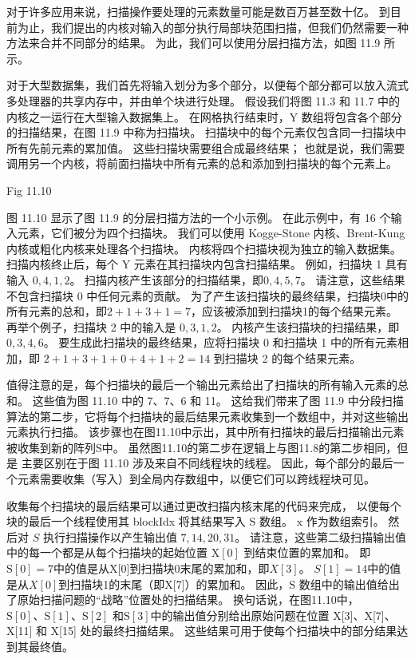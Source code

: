对于许多应用来说，扫描操作要处理的元素数量可能是数百万甚至数十亿。 
到目前为止，我们提出的内核对输入的部分执行局部块范围扫描，但我们仍然需要一种方法来合并不同部分的结果。 
为此，我们可以使用分层扫描方法，如图 11.9 所示。

对于大型数据集，我们首先将输入划分为多个部分，以便每个部分都可以放入流式多处理器的共享内存中，并由单个块进行处理。 
假设我们将图 11.3 和 11.7 中的内核之一运行在大型输入数据集上。 
在网格执行结束时，$\mathrm{Y}$ 数组将包含各个部分的扫描结果，在图 11.9 中称为扫描块。 
扫描块中的每个元素仅包含同一扫描块中所有先前元素的累加值。 
这些扫描块需要组合成最终结果； 也就是说，我们需要调用另一个内核，将前面扫描块中所有元素的总和添加到扫描块的每个元素上。

{\color{red} Fig 11.10}

图 11.10 显示了图 11.9 的分层扫描方法的一个小示例。 在此示例中，有 16 个输入元素，它们被分为四个扫描块。 
我们可以使用 Kogge-Stone 内核、Brent-Kung 内核或粗化内核来处理各个扫描块。 内核将四个扫描块视为独立的输入数据集。 
扫描内核终止后，每个 Y 元素在其扫描块内包含扫描结果。 例如，扫描块 1 具有输入 $0,4,1,2$。 
扫描内核产生该部分的扫描结果，即$0,4,5,7$。 请注意，这些结果不包含扫描块 0 中任何元素的贡献。 
为了产生该扫描块的最终结果，扫描块0中的所有元素的总和，即$2+1+3+1=7$，应该被添加到扫描块1的每个结果元素。 
再举个例子，扫描块 2 中的输入是 $0,3,1,2$。 内核产生该扫描块的扫描结果，即$0,3,4,6$。 
要生成此扫描块的最终结果，应将扫描块 0 和扫描块 1 中的所有元素相加，即 $2+1+3+1+0+4+1+2=14$ 到扫描块 2 的每个结果元素。

值得注意的是，每个扫描块的最后一个输出元素给出了扫描块的所有输入元素的总和。 这些值为图 11.10 中的 7、7、6 和 11。 
这给我们带来了图 11.9 中分段扫描算法的第二步，它将每个扫描块的最后结果元素收集到一个数组中，并对这些输出元素执行扫描。 
该步骤也在图11.10中示出，其中所有扫描块的最后扫描输出元素被收集到新的阵列S中。
虽然图11.10的第二步在逻辑上与图11.8的第二步相同，但是 主要区别在于图 11.10 涉及来自不同线程块的线程。 
因此，每个部分的最后一个元素需要收集（写入）到全局内存数组中，以便它们可以跨线程块可见。

收集每个扫描块的最后结果可以通过更改扫描内核末尾的代码来完成，
以便每个块的最后一个线程使用其 blockIdx 将其结果写入 $\mathrm{S}$ 数组。 $\mathrm{x}$ 作为数组索引。 
然后对 $S$ 执行扫描操作以产生输出值 $7,14,20,31$。 
请注意，这些第二级扫描输出值中的每一个都是从每个扫描块的起始位置 $\mathrm{X}[0]$ 到结束位置的累加和。 
即$\mathrm{S}[0]=7$中的值是从X[0]到扫描块0末尾的累加和，即$X[3]$。 
$S[1]=14$中的值是从$X[0]$到扫描块1的末尾（即X[7]）的累加和。 
因此，$\mathrm{S}$ 数组中的输出值给出了原始扫描问题的“战略”位置处的扫描结果。 
换句话说，在图11.10中，$\mathrm{S}[0]、\mathrm{S}[1]、\mathrm{S}[2]$
和$\mathrm{S}[3]$中的输出值分别给出原始问题在位置 X[3]、X[7]、X[11] 和 X[15] 处的最终扫描结果。 
这些结果可用于使每个扫描块中的部分结果达到其最终值。

